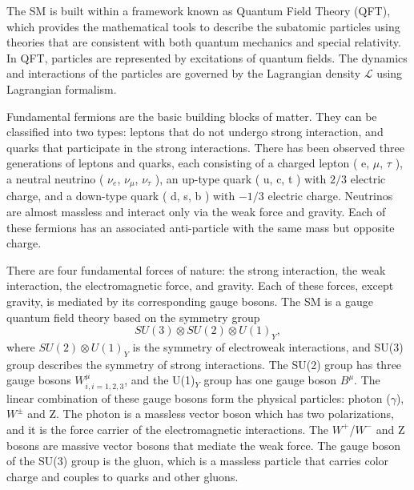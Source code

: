 \documentclass[thesis.tex]{subfiles}
\begin{document}
The SM is built within a framework known as Quantum Field Theory (QFT), which provides the mathematical tools to describe the subatomic particles using theories that are consistent with both quantum mechanics and special relativity. 
In QFT, particles are represented by excitations of quantum fields. 
The dynamics and interactions of the particles are governed by the Lagrangian density $\mathcal{L}$ using Lagrangian formalism.

Fundamental fermions are the basic building blocks of matter. 
They can be classified into two types: leptons that do not undergo strong interaction, and quarks that participate in the strong interactions. 
There has been observed three generations of leptons and quarks, each consisting of a charged lepton ( e, $\mu$, $\tau$ ), a neutral neutrino ( $\nu_e$, $\nu_\mu$, $\nu_\tau$ ),  an up-type quark ( u, c, t ) with $2/3$ electric charge, and a down-type quark ( d, s, b ) with $-1/3$ electric charge. 
Neutrinos are almost massless and interact only via the weak force and gravity.
Each of these fermions has an associated anti-particle with the same mass but opposite charge. 

There are four fundamental forces of nature: the strong interaction, the weak interaction, the electromagnetic force, and gravity. 
Each of these forces, except gravity, is mediated by its corresponding gauge bosons. 
The SM is a gauge quantum field theory based on the symmetry group 
	\begin{equation}
		SU(3) \otimes SU(2) \otimes U(1)_Y,
	\end{equation}
where $SU(2)\otimes U(1)_Y$ is the symmetry of electroweak interactions, and SU(3) group describes the symmetry of strong interactions. 
The SU(2) group has three gauge bosons $W_{i, i = 1,2,3}^{\mu}$, and the U(1)$_Y$ group has one gauge boson $B^{\mu}$. 
The linear combination of these gauge bosons form the physical particles: photon ($\gamma$), $W^{\pm}$ and Z. 
The photon is a massless vector boson which has two polarizations, and it is the force carrier of the electromagnetic interactions. 
The $W^+$/$W^{-}$ and Z bosons are massive vector bosons that mediate the weak force. 
The gauge boson of the SU(3) group is the gluon, which is a massless particle that carries color charge and couples to quarks and other gluons. 
 
\end{document}
